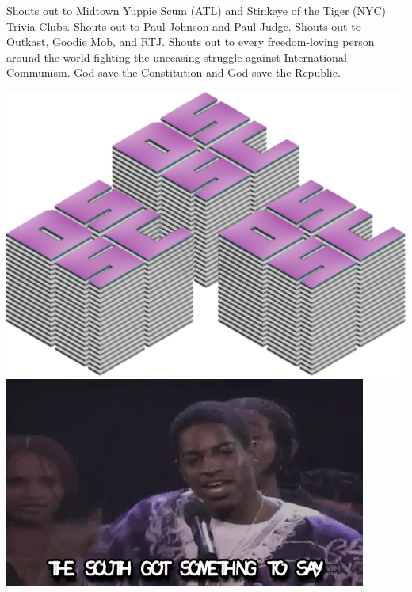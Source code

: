 \documentclass[letterpaper,10pt]{article}
\begin{document}
Shouts out to Midtown Yuppie Scum (ATL) and Stinkeye of the Tiger (NYC) Trivia
Clubs. Shouts out to Paul Johnson and Paul Judge. Shouts out to Outkast, Goodie
Mob, and RTJ. Shouts out to every freedom-loving person around the world
fighting the unceasing struggle against International Communism. God save the
Constitution and God save the Republic.
\vfill
\begin{center}
\includegraphics[width=.4\linewidth]{../common/dsscaw-purp-scaled.png}
\includegraphics[width=.5\linewidth]{../common/south.png}
\end{center}

\end{document}
